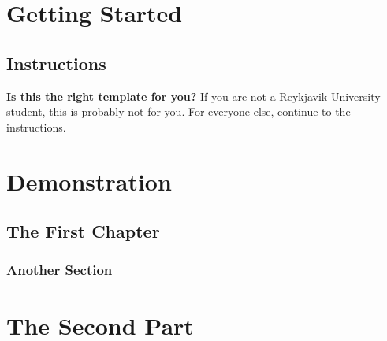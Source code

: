 \documentclass[12pt,a4paper]{memoir}
\begin{document}
\mainmatter{}

\part{Getting Started} %
\chapter{Instructions}
\textbf{Is this the right template for you?}
If you are not a Reykjavik University student, this is probably not for you.
For everyone else, continue to the instructions.

\part{Demonstration}
\chapter{The First Chapter}
\section{Another Section}
\part{The Second Part} %




\appendix{}%


\clearforchapter{}
\printindex{}%
\end{document}
